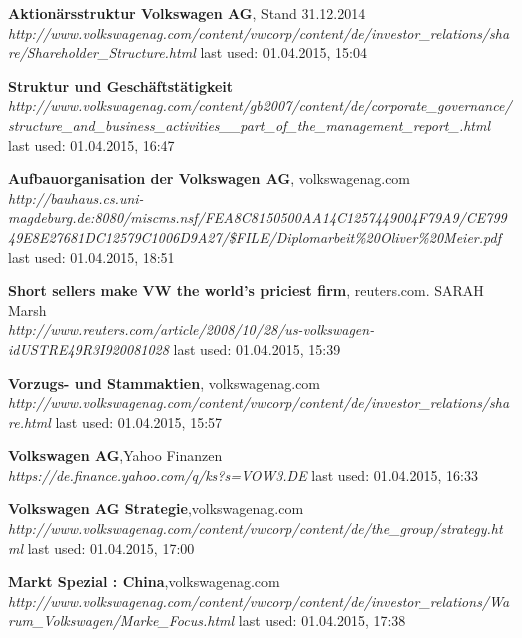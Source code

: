 \documentclass[12pt]{article}
\begin{document}
\begin{thebibliography}{56}
    
  \textbf{Aktionärsstruktur Volkswagen AG}, Stand 31.12.2014 \\
  \textit{http://www.volkswagenag.com/content/vwcorp/content/de/investor\_relations/share/Shareholder\_Structure.html}
  \newline last used: 01.04.2015, 15:04
    
  \textbf{Struktur und Geschäftstätigkeit}\\
  \textit{http://www.volkswagenag.com/content/gb2007/content/de/corporate\_governance/structure\_and\_business\_activities\_\_part\_of\_the\_management\_report\_.html}
  \newline last used: 01.04.2015, 16:47
  
  \textbf{Aufbauorganisation der Volkswagen AG}, volkswagenag.com \\
  \textit{http://bauhaus.cs.uni-magdeburg.de:8080/miscms.nsf/FEA8C8150500AA14C1257449004F79A9/CE79949E8E27681DC12579C1006D9A27/\$FILE/Diplomarbeit\%20Oliver\%20Meier.pdf}
  \newline last used: 01.04.2015, 18:51  
  
 \textbf{Short sellers make VW the world's priciest firm}, reuters.com. SARAH Marsh \\
  \textit{  http://www.reuters.com/article/2008/10/28/us-volkswagen-idUSTRE49R3I920081028}
  \newline last used: 01.04.2015, 15:39  
  
 \textbf{Vorzugs- und Stammaktien}, volkswagenag.com \\
  \textit{   http://www.volkswagenag.com/content/vwcorp/content/de/investor\_relations/share.html}
  \newline last used: 01.04.2015, 15:57  

 \textbf{Volkswagen AG},Yahoo Finanzen \\
  \textit{  https://de.finance.yahoo.com/q/ks?s=VOW3.DE}
  \newline last used: 01.04.2015, 16:33  
  
 \textbf{Volkswagen AG Strategie},volkswagenag.com \\
  \textit{http://www.volkswagenag.com/content/vwcorp/content/de/the\_group/strategy.html}
  \newline last used: 01.04.2015, 17:00  
    
 \textbf{Markt Spezial : China},volkswagenag.com \\
  \textit{http://www.volkswagenag.com/content/vwcorp/content/de/investor\_relations/Warum\_Volkswagen/Marke\_Focus.html
}
  \newline last used: 01.04.2015, 17:38
  

\end{thebibliography}
\end{document}
